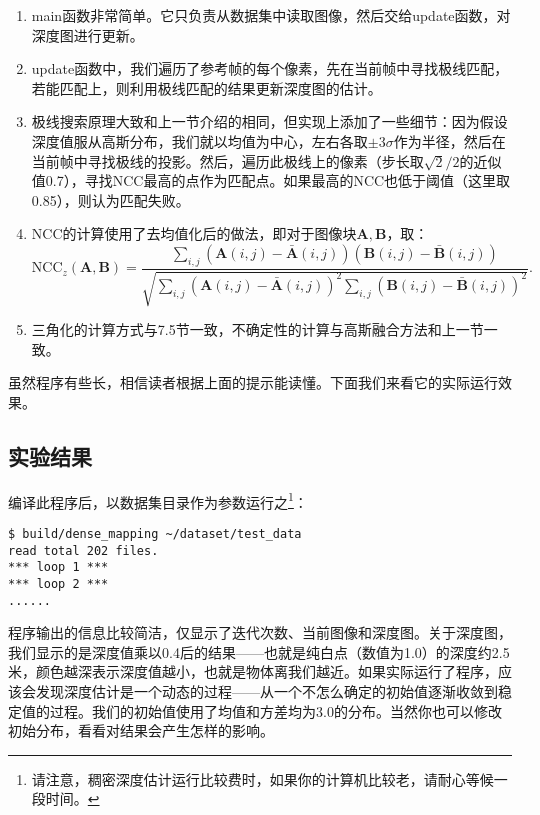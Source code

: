 \begin{enumerate}
	\item main函数非常简单。它只负责从数据集中读取图像，然后交给update函数，对深度图进行更新。
	\item update函数中，我们遍历了参考帧的每个像素，先在当前帧中寻找极线匹配，若能匹配上，则利用极线匹配的结果更新深度图的估计。
	\item 极线搜索原理大致和上一节介绍的相同，但实现上添加了一些细节：因为假设深度值服从高斯分布，我们就以均值为中心，左右各取$\pm 3 \sigma$作为半径，然后在当前帧中寻找极线的投影。然后，遍历此极线上的像素（步长取$\sqrt{2}/2$的近似值0.7），寻找NCC最高的点作为匹配点。如果最高的NCC也低于阈值（这里取0.85），则认为匹配失败。
	\item NCC的计算使用了去均值化后的做法，即对于图像块$\bm{A}, \bm{B}$，取：
	\begin{equation}
	\mathrm{NCC}_{z} (\bm{A}, \bm{B}) = \frac{{\sum\limits_{i,j} {\left( {\bm{A}(i,j) - \bm{\bar{ A}}(i,j)} \right)\left( {\bm{B}(i,j) - \bm{\bar {B}}(i,j)} \right)} }}{{\sqrt {\sum\limits_{i,j} {{{\left( {\bm{A}(i,j) - \bm{\bar {A}}(i,j)} \right)}^2}} \sum\limits_{i,j} {{{\left( {\bm{B}(i,j) - \bm{\bar {B}}(i,j)} \right)}^2}} } }}.
	\end{equation}
	\item 三角化的计算方式与7.5节一致，不确定性的计算与高斯融合方法和上一节一致。
\end{enumerate}

虽然程序有些长，相信读者根据上面的提示能读懂。下面我们来看它的实际运行效果。

\subsection*{实验结果}
编译此程序后，以数据集目录作为参数运行之\footnote{请注意，稠密深度估计运行比较费时，如果你的计算机比较老，请耐心等候一段时间。}：
\begin{lstlisting}
$ build/dense_mapping ~/dataset/test_data 
read total 202 files.
*** loop 1 ***
*** loop 2 ***
......
\end{lstlisting}

程序输出的信息比较简洁，仅显示了迭代次数、当前图像和深度图。关于深度图，我们显示的是深度值乘以0.4后的结果——也就是纯白点（数值为1.0）的深度约2.5米，颜色越深表示深度值越小，也就是物体离我们越近。如果实际运行了程序，应该会发现深度估计是一个动态的过程——从一个不怎么确定的初始值逐渐收敛到稳定值的过程。我们的初始值使用了均值和方差均为3.0的分布。当然你也可以修改初始分布，看看对结果会产生怎样的影响。

